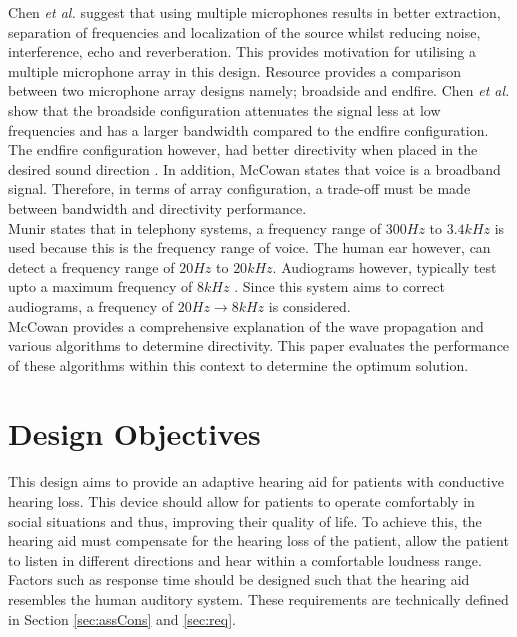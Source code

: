 \documentclass[11pt,onecolumn]{witseiepaper}
\begin{document}
\newline
\noindent Chen \textit{et al.} \cite{present} suggest that using multiple microphones results in better extraction, separation of frequencies and localization of the source whilst reducing noise, interference, echo and reverberation. This provides motivation for utilising a multiple microphone array in this design. Resource \cite{broadEnd} provides a comparison between two microphone array designs namely; broadside and endfire. Chen \textit{et al.} show that the broadside configuration attenuates the signal less at low frequencies and has a larger bandwidth compared to the endfire configuration. The endfire configuration however, had better directivity when placed in the desired sound direction \cite{broadEnd}. In addition, McCowan \cite{mccowan} states that voice is a broadband signal. Therefore, in terms of array configuration, a trade-off must be made between bandwidth and directivity performance.  \\
\newline
\noindent Munir \cite{munir} states that in telephony systems, a frequency range of $300Hz$ to $3.4kHz$ is used because this is the frequency range of voice. The human ear however, can detect a frequency range of $20Hz$ to $20kHz$. Audiograms however, typically test upto a maximum frequency of $8kHz$ \cite{audioMaxFreq}. Since this system aims to correct audiograms, a frequency of $20Hz \rightarrow 8kHz$ is considered.\\
\newline
\noindent McCowan \cite{mccowan} provides a comprehensive explanation of the wave propagation and various algorithms to determine directivity. This paper evaluates the performance of these algorithms within this context to determine the optimum solution.\\
\newline

\section{Design Objectives}

\noindent This design aims to provide an adaptive hearing aid for patients with conductive hearing loss. This device should allow for patients to operate comfortably in social situations and thus, improving their quality of life. To achieve this, the hearing aid must compensate for the hearing loss of the patient, allow the patient to listen in different directions and hear within a comfortable loudness range. Factors such as response time should be designed such that the hearing aid resembles the human auditory system. These requirements are technically defined in Section \ref{sec:assCons} and \ref{sec:req}.
\end{document}
